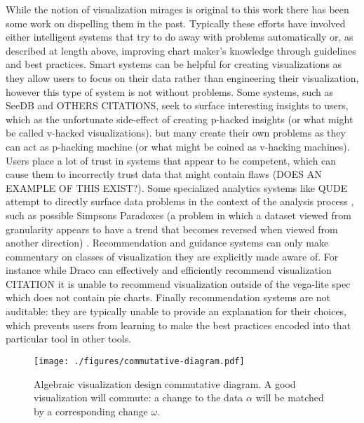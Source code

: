 While the notion of visualization mirages is original to this work there has been some work on dispelling them in the past. Typically these efforts have involved either intelligent systems that try to do away with problems automatically or, as described at length above, improving chart maker's knowledge through guidelines and best practices.
%
Smart systems can be helpful for creating visualizations as they allow users to focus on their data rather than engineering their visualization, however this type of system is not without problems.
Some systems, such as SeeDB and OTHERS CITATIONS, seek to surface interesting insights to users, which as the unfortunate side-effect of creating p-hacked insights (or what might be called v-hacked visualizations). but many create their own problems as they can act as p-hacking machine \cite{pu2018garden} (or what might be coined as v-hacking machines).
Users place a lot of trust in systems that appear to be competent, which can cause them to incorrectly trust data that might contain flaws (DOES AN EXAMPLE OF THIS EXIST?).
Some specialized analytics systems like QUDE attempt to directly surface data problems in the context of the analysis process \cite{binnig2017toward}, such as possible Simpsons Paradoxes (a problem in which a dataset viewed from granularity appears to have a trend that becomes reversed when viewed from another direction) \cite{guo2017you}.
Recommendation and guidance systems can only make commentary on classes of visualization they are explicitly made aware of. For instance while Draco can effectively and efficiently recommend visualization CITATION it is unable to recommend visualization outside of the vega-lite spec which does not contain pie charts.
Finally recommendation systems are not auditable: they are typically unable to provide an explanation for their choices, which prevents users from learning to make the best practices encoded into that particular tool in other tools.







\begin{figure}[bth]
   \centering
   \texttt{[image: ./figures/commutative-diagram.pdf]}
   \caption{Algebraic visualization design commutative diagram. A good visualization will commute: a change to the data $\alpha$ will be matched by a corresponding change $\omega$.}
   \label{fig:commutative-diagram}
\end{figure}



